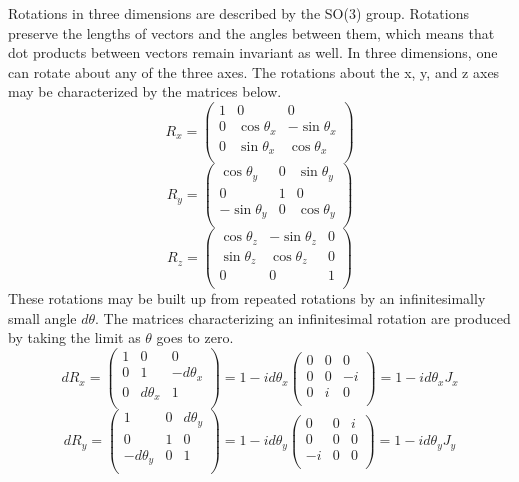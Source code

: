 \documentclass[12pt]{article}
\begin{document}
Rotations in three dimensions are described by the SO(3) group. Rotations preserve the lengths of vectors and the angles between them, which means that dot products between vectors remain invariant as well. In three dimensions, one can rotate about any of the three axes. The rotations about the x, y, and z axes may be characterized by the matrices below.
\begin{equation}
R_x = 
\begin{pmatrix}
1 & 0 & 0 \\
0 & \cos\theta_x & -\sin\theta_x \\
0 & \sin\theta_x & \cos\theta_x \\
\end{pmatrix}
\end{equation}
\begin{equation}
R_y = 
\begin{pmatrix}
\cos\theta_y & 0 & \sin\theta_y \\
0 & 1 & 0 \\
-\sin\theta_y & 0 & \cos\theta_y \\
\end{pmatrix}
\end{equation}
\begin{equation}
R_z = 
\begin{pmatrix}
\cos\theta_z & -\sin\theta_z & 0 \\
\sin\theta_z & \cos\theta_z & 0 \\
0 & 0 & 1 \\
\end{pmatrix}
\end{equation}
These rotations may be built up from repeated rotations by an infinitesimally small angle $d\theta$. The matrices characterizing an infinitesimal rotation are produced by taking the limit as $\theta$ goes to zero.
\begin{equation}
dR_x = 
\begin{pmatrix}
1 & 0 & 0 \\
0 & 1 & -d\theta_x \\
0 & d\theta_x & 1 \\
\end{pmatrix}
= 1 - id\theta_x
\begin{pmatrix}
0 & 0 & 0 \\
0 & 0 & -i \\
0 & i & 0 \\
\end{pmatrix}
= 1 - id\theta_x J_x
\end{equation}
\begin{equation}
dR_y = 
\begin{pmatrix}
1 & 0 & d\theta_y \\
0 & 1 & 0 \\
-d\theta_y & 0 & 1 \\
\end{pmatrix}
= 1 - id\theta_y
\begin{pmatrix}
0 & 0 & i \\
0 & 0 & 0 \\
-i & 0 & 0 \\
\end{pmatrix}
= 1 - id\theta_y J_y
\end{equation}
\end{document}
